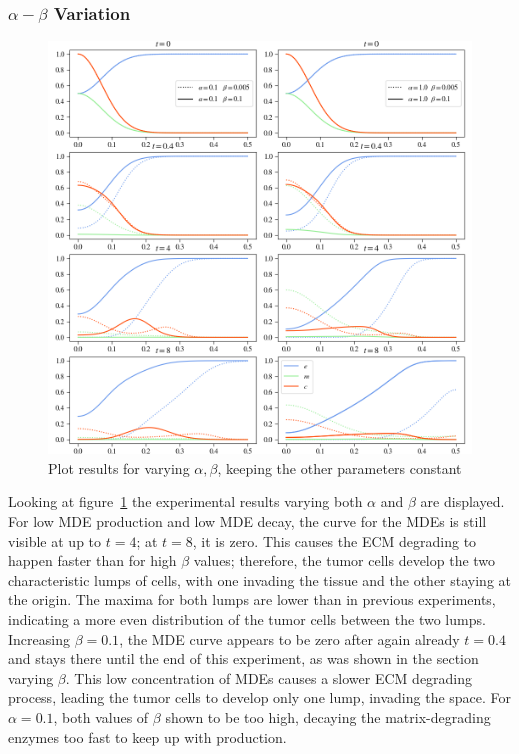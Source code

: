 \subsubsection*{$\alpha - \beta$ Variation}
\begin{figure}[h!]
    \centering
    \includegraphics[width=\textwidth]{resources/images/alpha_beta_variation.png}
    \caption{Plot results for varying $\alpha, \beta$, keeping the other parameters constant}
    \label{fig:alpha_beta_variation}
\end{figure}
Looking at figure~\ref{fig:alpha_beta_variation} the experimental results varying both $\alpha$ and $\beta$ are displayed. For low MDE production and low MDE decay, the curve for the MDEs is still visible at up to $t=4$; at $t=8$, it is zero. This causes the ECM degrading to happen faster than for high $\beta$ values; therefore, the tumor cells develop the two characteristic lumps of cells, with one invading the tissue and the other staying at the origin. The maxima for both lumps are lower than in previous experiments, indicating a more even distribution of the tumor cells between the two lumps. Increasing $\beta=0.1$, the MDE curve appears to be zero after again already $t=0.4$ and stays there until the end of this experiment, as was shown in the section varying $\beta$. This low concentration of MDEs causes a slower ECM degrading process, leading the tumor cells to develop only one lump, invading the space. For $\alpha=0.1$, both values of $\beta$ shown to be too high, decaying the matrix-degrading enzymes too fast to keep up with production.

